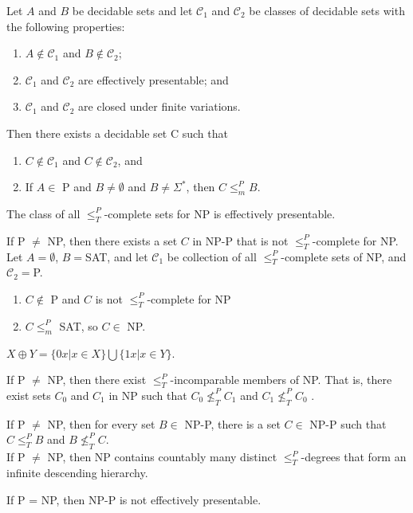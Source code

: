  Let $A$ and $B$ be decidable sets and let $\mathscr{C}_1$ and
$\mathscr{C}_2$ be classes of decidable sets with the following properties:
\begin{enumerate}
  \item $A \notin \mathscr{C}_1$ and $B \notin \mathscr{C}_2$;
  \item $\mathscr{C}_1$ and $\mathscr{C}_2$ are effectively presentable; and
  \item $\mathscr{C}_1$ and $\mathscr{C}_2$ are closed under finite variations.
\end{enumerate}
Then there exists a decidable set C such that
\begin{enumerate}
  \item $C \notin \mathscr{C}_1$ and $C \notin \mathscr{C}_2$, and
  \item If $A \in$ P and $B \ne \emptyset$ and $B \ne \Sigma^*$, then $C
    \le^P_m B$.
\end{enumerate}

 The class of all $\le^P_T$-complete sets for NP is effectively presentable.

 If P $\ne$ NP, then there exists a set $C$ in NP-P
that is not $\le^P_T$-complete for NP.\\
Let $A=\emptyset$, $B=$SAT, and let $\mathscr{C}_1$ be collection of all
$\le^P_T$-complete sets of NP, and $\mathscr{C}_2 =$P.
\begin{enumerate}
  \item $C \notin$ P and $C$ is not $\le^P_T$-complete for NP
  \item $C \le^P_m$ SAT, so $C \in$ NP.
\end{enumerate}

 $X \oplus Y = \{0x | x \in X\} \bigcup \{1x | x \in
Y\}$.

 If P $\ne$ NP, then there exist $\le^P_T$-incomparable
members of NP. That is, there exist sets $C_0$ and $C_1$ in NP such that 
$C_0 \nleq^P_T C_1$ and $C_1 \nleq^P_T C_0$ .

 If P $\ne$ NP, then for every set $B \in$ NP-P, there is a 
set $C \in$ NP-P such that $C \le^P_T B$ and $B \nleq^P_T C$.\\
If P $\ne$ NP, then NP contains countably many distinct $\le^P_T$-degrees that form 
an infinite descending hierarchy.

 If P = NP, then NP-P is not effectively presentable.


